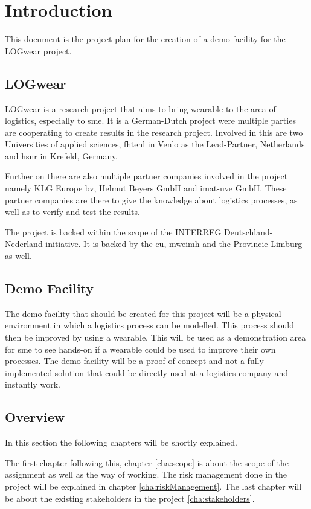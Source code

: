 \chapter{Introduction}
This document is the project plan for the creation of a demo facility for the LOGwear project.

\section{LOGwear}
LOGwear is a research project that aims to bring wearable to the area of logistics, especially to \gls{sme}. It is a German-Dutch project were multiple parties are cooperating to create results in the research project. Involved in this are two Universities of applied sciences, \gls{fhtenl} in Venlo as the Lead-Partner, Netherlands and \gls{hsnr} in Krefeld, Germany.

Further on there are also multiple partner companies involved in the project namely KLG Europe bv, Helmut Beyers GmbH and imat-uve GmbH. These partner companies are there to give the knowledge about logistics processes, as well as to verify and test the results.

The project is backed within the scope of the INTERREG Deutschland-Nederland initiative. It is backed by the \gls{eu}, \gls{mweimh} and the Provincie Limburg as well.

\section{Demo Facility}
The demo facility that should be created for this project will be a physical environment in which a logistics process can be modelled. This process should then be improved by using a wearable. This will be used as a demonstration area for \gls{sme} to see hands-on if a wearable could be used to improve their own processes. The demo facility will be a proof of concept and not a fully implemented solution that could be directly used at a logistics company and instantly work. %
\section{Overview}
In this section the following chapters will be shortly explained. 

The first chapter following this, chapter \ref{cha:scope} is about the scope of the assignment as well as the way of working. The risk management done in the project will be explained in chapter \ref{cha:riskManagement}. The last chapter will be about the existing stakeholders in the project \ref{cha:stakeholders}.